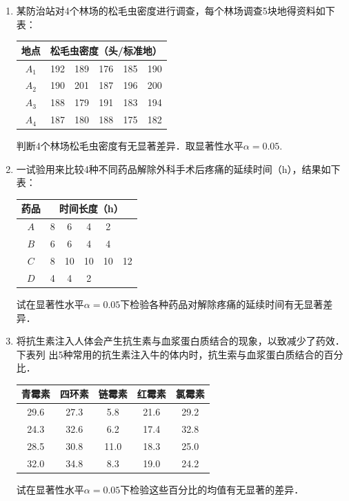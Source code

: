 \begin{enumerate}
    \item 某防治站对4个林场的松毛虫密度进行调查，每个林场调查5块地得资料如下表：
    \renewcommand{\arraystretch}{1.3}
    \begin{table}[H]\centering
        \begin{tabular}{cccccc}
        \hline
        地点    & \multicolumn{5}{c}{松毛虫密度（头/标准地）} \\ \hline
        $A_1$ & 192  & 189  & 176  & 185  & 190  \\
        $A_2$ & 190  & 201  & 187  & 196  & 200  \\
        $A_3$ & 188  & 179  & 191  & 183  & 194  \\
        $A_4$ & 187  & 180  & 188  & 175  & 182  \\ \hline
        \end{tabular}
        \end{table}
    判断4个林场松毛虫密度有无显著差异．取显著性水平$\alpha=0.05$.
    \renewcommand{\arraystretch}{1.0}




    \item 一试验用来比较4种不同药品解除外科手术后疼痛的延续时间（h），结果如下表：
    \renewcommand{\arraystretch}{1.3}
    \begin{table}[H]\centering
        \begin{tabular}{cccccc}
        \hline
        药品  & \multicolumn{5}{c}{时间长度（h）} \\ \hline
        $A$ & 8   & 6   & 4   & 2   &     \\
        $B$ & 6   & 6   & 4   & 4   &     \\
        $C$ & 8   & 10  & 10  & 10  & 12  \\
        $D$ & 4   & 4   & 2   &     &     \\ \hline
        \end{tabular}
    \end{table}
    \renewcommand{\arraystretch}{1.0}
    试在显著性水平$\alpha=0.05$下检验各种药品对解除疼痛的延续时间有无显著差异．




    \item 将抗生素注入人体会产生抗生素与血浆蛋白质结合的现象，以致减少了药效．下表列
    出5种常用的抗生素注入牛的体内时，抗生索与血浆蛋白质结合的百分比．
    \renewcommand{\arraystretch}{1.3}
    \begin{table}[H]\centering
        \begin{tabular}{ccccc}
        \hline
        青霉素  & 四环素  & 链霉素  & 红霉素  & 氯霉素  \\ \hline
        29.6 & 27.3 & 5.8  & 21.6 & 29.2 \\
        24.3 & 32.6 & 6.2  & 17.4 & 32.8 \\
        28.5 & 30.8 & 11.0 & 18.3 & 25.0 \\
        32.0 & 34.8 & 8.3  & 19.0 & 24.2 \\ \hline
        \end{tabular}
    \end{table}
    \renewcommand{\arraystretch}{1.0}
    试在显著性水平$\alpha=0.05$下检验这些百分比的均值有无显著的差异．




\end{enumerate}
